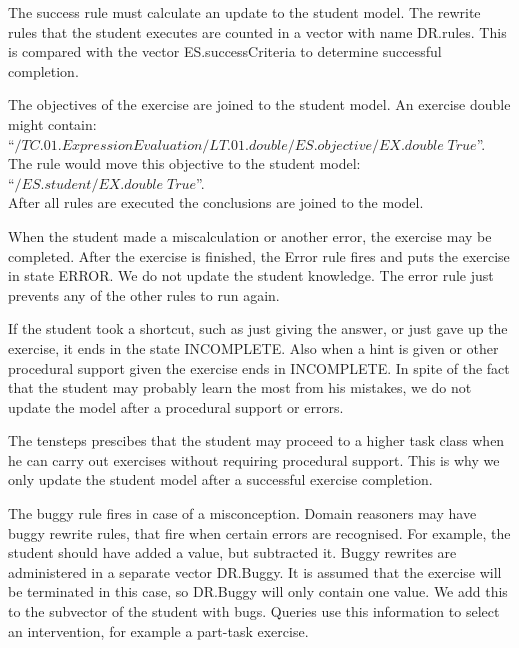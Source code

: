  
The success rule must calculate an update to the student model.
The rewrite rules that the student executes are counted in a vector with name DR.rules.
This is compared with the vector ES.successCriteria to determine successful completion.

The objectives of the exercise are joined to the student model. An exercise double might contain:\\
``$\mathit{/TC.01.ExpressionEvaluation/LT.01.double/ES.objective/EX.double\; True}$''.\\
The rule would move this objective to the student model:\\
``$\mathit{/ES.student/EX.double\; True}$''.\\
After all rules are executed the conclusions are joined to the model.

When the student made a miscalculation or another error,  the exercise may be completed.
After the exercise is finished, the Error rule fires and puts the exercise in state ERROR.
We do not update the student knowledge. 
The error rule just prevents any of the other rules to run again.

If the student took a shortcut, such as just giving the answer, or just gave up the exercise, it ends in the state INCOMPLETE.
Also when a hint is given or other procedural support given the exercise ends in INCOMPLETE.
In spite of the fact that the student may probably learn the most from his mistakes, we do not update the model after a procedural support or errors.

The \gls{tensteps} prescibes that the student may proceed to a higher task class when he can carry out exercises without requiring
procedural support. This is why we only update the student model after a successful exercise completion.

The buggy rule fires in case of a misconception. 
Domain reasoners may have buggy rewrite rules, that fire when certain errors are recognised.
For example, the student should have added a value, but subtracted it.
Buggy rewrites are administered in a separate vector DR.Buggy.
It is assumed that the exercise will be terminated in this case, so DR.Buggy will only contain one value.
We add this to the subvector of the student with bugs.
Queries  use this information to select an intervention, for example a part-task exercise.

  

